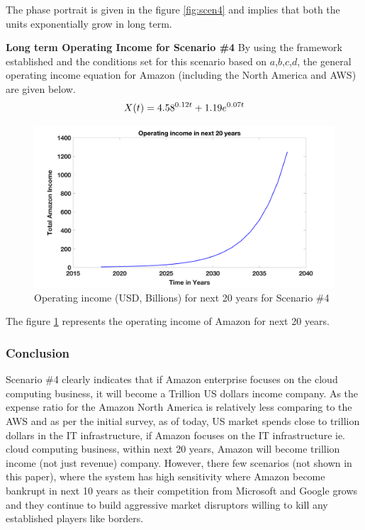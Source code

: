 \documentclass[fleqn,10pt]{SelfArx} %
\begin{document}
The phase portrait is given in the figure \ref{fig:scen4} and implies that both the units exponentially grow in long term. 

\textbf{Long term Operating Income for Scenario \#4}
By using the framework established and the conditions set for this scenario based on $a$,$b$,$c$,$d$, the general operating income equation for Amazon (including the North America and AWS) are given below. 
\begin{equation} \centering
X(t) = 4.58^{0.12 t} + 1.19 e^{0.07 t}
\label{eq:s4}
\end{equation}

\begin{figure}[ht]\centering
\includegraphics[width=\linewidth]{scen4income}
\caption{Operating income (USD, Billions) for next 20 years for Scenario \#4}
\label{fig:scen4income}
\end{figure}

The figure \ref{fig:scen4income} represents the operating income of Amazon for next 20 years. 

\subsubsection{Conclusion}
Scenario \#4 clearly indicates that if Amazon enterprise focuses on the cloud computing business, it will become a Trillion US dollars income company. As the expense ratio for the Amazon North America is relatively less comparing to the AWS and as per the initial survey, as of today, US market spends close to trillion dollars in the IT infrastructure, if Amazon focuses on the IT infrastructure ie. cloud computing business, within next 20 years, Amazon will become trillion income (not just revenue) company. However, there few scenarios (not shown in this paper), where the system has high sensitivity where Amazon become bankrupt in next 10 years as their competition from Microsoft and Google grows and they continue to build aggressive market disruptors willing to kill any established players like borders. 
\end{document}

